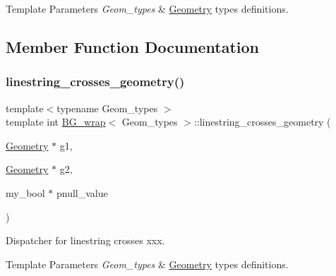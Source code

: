 \begin{DoxyTemplParams}{Template Parameters}
{\em Geom\+\_\+types} & \mbox{\hyperlink{classGeometry}{Geometry}} types definitions. \\
\hline
\end{DoxyTemplParams}


\subsection{Member Function Documentation}
\mbox{\label{classBG__wrap_acc1d1579c412ef461472291065389797}} 
\subsubsection{\texorpdfstring{linestring\+\_\+crosses\+\_\+geometry()}{linestring\_crosses\_geometry()}}
{\footnotesize\ttfamily template$<$typename Geom\+\_\+types $>$ \\
template int \mbox{\hyperlink{classBG__wrap}{B\+G\+\_\+wrap}}$<$ Geom\+\_\+types $>$\+::linestring\+\_\+crosses\+\_\+geometry (\begin{DoxyParamCaption}\item[{\mbox{\hyperlink{classGeometry}{Geometry}} $\ast$}]{g1,  }\item[{\mbox{\hyperlink{classGeometry}{Geometry}} $\ast$}]{g2,  }\item[{my\+\_\+bool $\ast$}]{pnull\+\_\+value }\end{DoxyParamCaption})\hspace{0.3cm}{\ttfamily [static]}}

Dispatcher for \textquotesingle{}linestring crosses xxx\textquotesingle{}.


\begin{DoxyTemplParams}{Template Parameters}
{\em Geom\+\_\+types} & \mbox{\hyperlink{classGeometry}{Geometry}} types definitions. \\
\hline
\end{DoxyTemplParams}

